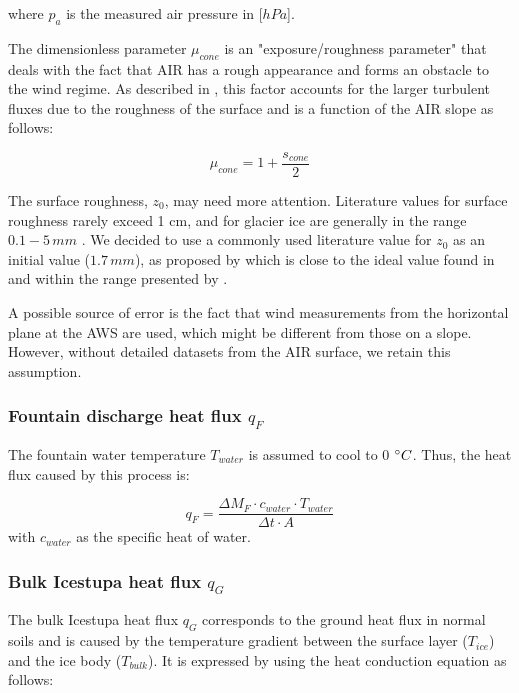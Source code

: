 \documentclass[utf8]{frontiersSCNS} %
\begin{document}
where $p_{a}$ is the measured air pressure in [$hPa$].

The dimensionless parameter $\mu_{cone}$ is an "exposure/roughness parameter" that deals with the fact that AIR has a
rough appearance and forms an obstacle to the wind regime. As described in \cite{Oerlemans_2021}, this factor accounts
for the larger turbulent fluxes due to the roughness of the surface and is a function of the AIR slope as follows:

\begin{equation}
	\mu_{cone} = 1 + \frac{s_{cone}}{2}
\end{equation}

The surface roughness, $z_{0}$, may need more attention. Literature values for surface roughness rarely exceed 1 cm, and
for glacier ice are generally in the range $0.1-5\, mm$ \citet{BrockWillisSharp_2006}. We decided to use a commonly used
literature value for $z_{0}$ as an initial value ($1.7\,mm$), as proposed by \cite{CuffeyPaterson_2010} which is close to
the ideal value found in \cite{reid_brock_2014} and within the range presented by \cite{BrockWillisSharp_2006}.

A possible source of error is the fact that wind measurements from the horizontal plane at the AWS are used, which might
be different from those on a slope. However, without detailed datasets from the AIR surface, we retain this
assumption.

\subsubsection{Fountain discharge heat flux \texorpdfstring{$q_{F}$}{Lg} }
The fountain water temperature $T_{water}$ is assumed to cool to 0 $\degree C$. Thus, the heat flux caused by this
process is:

\begin{equation}
	q_{F} = \frac{ \Delta M_F \cdot c_{water} \cdot T_{water}}{\Delta t \cdot A}
	\label{eqn:qF}
\end{equation}
with $c_{water}$ as the specific heat of water.

\subsubsection{Bulk Icestupa heat flux \texorpdfstring{$q_{G}$}{Lg}} \label{sec:Bulkflux}
The bulk Icestupa heat flux $q_{G}$ corresponds to the ground heat flux in normal soils and is caused by the temperature
gradient between the surface layer ($T_{ice}$) and the ice body ($T_{bulk}$). It is expressed by using the heat
conduction equation as follows:
\end{document}
